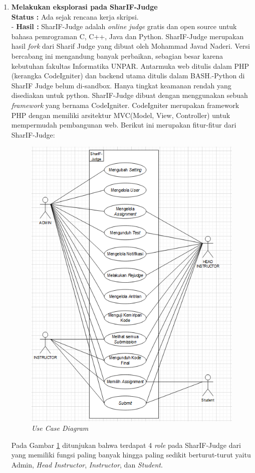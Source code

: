 \documentclass[a4paper,twoside]{article}
\begin{document}
\begin{enumerate}
	
	    \item \textbf{Melakukan eksplorasi pada  SharIF-Judge}\\
		{\bf Status :} Ada sejak rencana kerja skripsi.\\
-		{\bf Hasil :} SharIF-Judge adalah \textit{online judge} gratis dan open source untuk bahasa pemrograman C, C++, Java dan Python. SharIF-Judge merupakan hasil \textit{fork} dari Sharif Judge yang dibuat oleh Mohammad Javad Naderi. Versi bercabang ini mengandung banyak perbaikan, sebagian besar karena kebutuhan fakultas Informatika UNPAR. Antarmuka web ditulis dalam PHP (kerangka CodeIgniter) dan backend utama ditulis dalam BASH.-Python di SharIF Judge belum di-sandbox. Hanya tingkat keamanan rendah yang disediakan untuk python. SharIF-Judge dibuat dengan menggunakan sebuah \textit{framework} yang bernama CodeIgniter. CodeIgniter merupakan framework PHP dengan memiliki arsitektur MVC(Model, View, Controller) untuk mempermudah pembangunan web. Berikut ini merupakan fitur-fitur dari SharIF-Judge:
\begin{figure}[h!]
     \centering
     \includegraphics[width=0.5\linewidth]{Gambar/Usecase Diagram.PNG}
     \caption{\textit{Use Case Diagram}}
     \label{fig:Use Case Diagram}
 \end{figure}\newline
Pada Gambar \ref{fig:Use Case Diagram} ditunjukan bahwa terdapat 4 \textit{role} pada SharIF-Judge dari yang memiliki fungsi paling banyak hingga paling sedikit berturut-turut yaitu Admin, \textit{Head Instructor}, \textit{Instructor}, dan \textit{Student}.


\end{enumerate}
\end{document}

